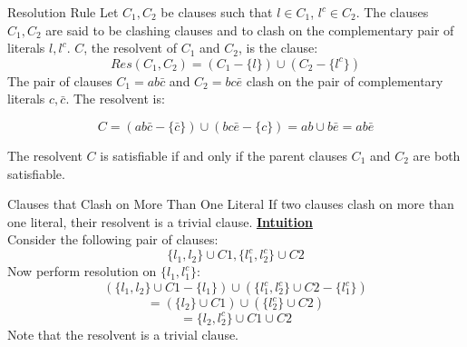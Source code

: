 \documentclass[style=sailor,size=12pt]{powerdot}
\theoremstyle{definition}
\newenvironment{ex}[1]
  {\renewcommand\theinnerexample{#1}\innerexample}
  {\endinnerexample}
\newenvironment{thm}[1]
  {\renewcommand\theinnerthm{#1}\innerthm}
  {\endinnerthm}
\newenvironment{lem}[1]
  {\renewcommand\theinnerlem{#1}\innerlem}
  {\endinnerlem}
\begin{document}
\begin{wideslide}[bm=,toc=]{Resolution Rule}
Let $C_1, C_2$ be clauses such that $l \in C_1$, $l^c \in C_2$. The clauses
$C_1,C_2$ are said to be clashing clauses and to clash on the complementary
pair of literals $l,l^c$. $C$, the resolvent of $C_1$ and $C_2$, is the
clause:\\
\[ 
  Res(C_1,C_2) = (C_1 - \{l\}) \cup (C_2 - \{l^c\})
\]
\begin{ex}{4.15}[Ben Ari]
The pair of clauses $C_1 = ab\bar{c}$ and $C_2 = bc\bar{e}$ clash on the pair
of complementary literals $c, \bar{c}$. The resolvent is:

\[ 
  C = (ab\bar{c} - \{\bar{c}\}) \cup (bc\bar{e} - \{c\}) = ab\cup b\bar{e} = ab\bar{e}
  \]

\end{ex}
\begin{thm}{4.17}
The resolvent $C$ is satisfiable if and only if the parent clauses $C_1$ and
$C_2$ are both satisfiable.
\end{thm}

\end{wideslide}

\begin{wideslide}[bm=,toc=]{Clauses that Clash on More Than One Literal}
\begin{lem}{4.16}[Ben Ari]
If two clauses clash on more than one literal, their resolvent is a trivial
clause.
\end{lem}
{ \bf \underline{Intuition}}\\
Consider the following pair of clauses:
\[
  \{l_1, l_2\} \cup C1,  \{l_1^c, l_2^c\} \cup C2
  \]
Now perform resolution on $\{l_1, l_1^c\}$: 
\[
  (\{l_1, l_2\} \cup C1 - \{l_1\})\cup (\{l_1^c, l_2^c\} \cup C2 - \{l_1^c \})
\]
\[
  = (\{l_2\} \cup C1) \cup (\{l_2^c\} \cup C2)
\]
\[
  = \{l_2, l_2^c\} \cup C1 \cup C2
\]
Note that the resolvent is a trivial clause.
\end{wideslide}
\end{document}
